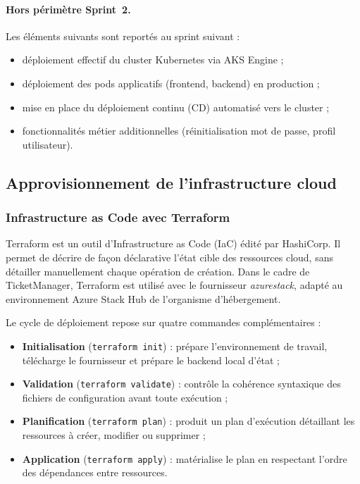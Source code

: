 \paragraph{Hors périmètre Sprint~2.}
Les éléments suivants sont reportés au sprint suivant :
\begin{itemize}
  \item déploiement effectif du cluster Kubernetes via AKS Engine ;
  \item déploiement des pods applicatifs (frontend, backend) en production ;
  \item mise en place du déploiement continu (CD) automatisé vers le cluster ;
  \item fonctionnalités métier additionnelles (réinitialisation mot de passe, profil utilisateur).
\end{itemize}


\subsection{Approvisionnement de l'infrastructure cloud}

\subsubsection{Infrastructure as Code avec Terraform}

Terraform est un outil d'Infrastructure as Code (IaC) édité par HashiCorp. Il permet de
décrire de façon déclarative l'état cible des ressources cloud, sans détailler manuellement
chaque opération de création. Dans le cadre de TicketManager, Terraform est utilisé avec le
fournisseur \textit{azurestack}, adapté au environnement Azure Stack Hub de l'organisme
d'hébergement.

Le cycle de déploiement repose sur quatre commandes complémentaires :

\begin{itemize}
  \item \textbf{Initialisation} (\texttt{terraform init}) : prépare l'environnement de travail,
        télécharge le fournisseur et prépare le backend local d'état ;
  \item \textbf{Validation} (\texttt{terraform validate}) : contrôle la cohérence syntaxique
        des fichiers de configuration avant toute exécution ;
  \item \textbf{Planification} (\texttt{terraform plan}) : produit un plan d'exécution
        détaillant les ressources à créer, modifier ou supprimer ;
  \item \textbf{Application} (\texttt{terraform apply}) : matérialise le plan en respectant
        l'ordre des dépendances entre ressources.
\end{itemize}

